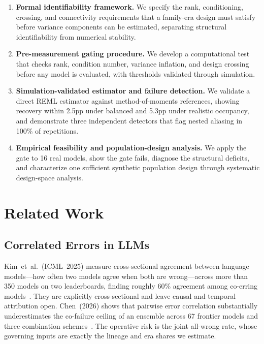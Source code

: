 \documentclass[journal]{IEEEtran}
\begin{document}
\begin{enumerate}
\item \textbf{Formal identifiability framework.} We specify the rank, conditioning, crossing, and connectivity requirements that a family-era design must satisfy before variance components can be estimated, separating structural identifiability from numerical stability.
\item \textbf{Pre-measurement gating procedure.} We develop a computational test that checks rank, condition number, variance inflation, and design crossing before any model is evaluated, with thresholds validated through simulation.
\item \textbf{Simulation-validated estimator and failure detection.} We validate a direct REML estimator against method-of-moments references, showing recovery within 2.5pp under balanced and 5.3pp under realistic occupancy, and demonstrate three independent detectors that flag nested aliasing in 100\% of repetitions.
\item \textbf{Empirical feasibility and population-design analysis.} We apply the gate to 16 real models, show the gate fails, diagnose the structural deficits, and characterize one sufficient synthetic population design through systematic design-space analysis.
\end{enumerate}

\section{Related Work}

\subsection{Correlated Errors in LLMs}

Kim~et~al.~(ICML~2025) measure cross-sectional agreement between language models---how often two models agree when both are wrong---across more than 350 models on two leaderboards, finding roughly 60\% agreement among co-erring models~\cite{kim2025}. They are explicitly cross-sectional and leave causal and temporal attribution open. Chen~(2026) shows that pairwise error correlation substantially underestimates the co-failure ceiling of an ensemble across 67 frontier models and three combination schemes~\cite{chen2026}. The operative risk is the joint all-wrong rate, whose governing inputs are exactly the lineage and era shares we estimate.
\end{document}
